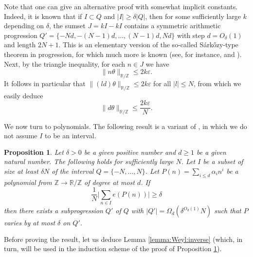 \documentclass[reqno]{amsart}
\newcommand\R{{\mathbb{R}}}
\newcommand\Z{{\mathbb{Z}}}
\newcommand\eps{{\varepsilon}}
\theoremstyle{plain}
\newtheorem{proposition}[theorem]{Proposition}
\theoremstyle{definition}
\begin{document}
Note that one can give an alternative proof with somewhat implicit constants. Indeed, it is known that if $I \subset Q$ and $|I| \ge \delta |Q|$, then for some sufficiently large $k$ depending on $\delta$, the sumset $J = kI-kI$ contains a symmetric arithmetic progression $Q'=\{-Nd,-(N-1)d,\dots, (N-1)d,Nd\}$ with step $d=O_{\delta}(1)$ and length $2N+1$.  This is an elementary version of the so-called S\'ark\H{o}zy-type theorem in progression, for which much more is known (see, for instance, \cite[Lemma 4.4, 5.5]{SzV} and \cite[Lemma B3]{Taosol}). Next, by the triangle inequality, for each $n\in J$ we have 
\[
\|n \theta\|_{\R/\Z} \le 2k \eps.
\]
It follows in particular that $\|(l d) \theta\|_{\R/\Z} \le 2k \eps$ for all $|l|\le N$, from which we easily deduce
\[
\|d\theta\|_{\R/\Z} \le \frac{2k \eps}{N}.
\]

We now turn to polynomials. The following result is a variant of \cite[Proposition 4]{Tao}, in which we do not assume $I$ to be an interval.

\begin{proposition}\label{prop:Weyl:inverse}
Let $\delta>0$ be a given positive number and $d\ge 1$ be a given natural number. The following holds for sufficiently large $N$. Let $I$ be a subset of size at least $\delta N$ of the interval $Q=\{-N,\dots, N\}$. Let $P(n) = \sum_{i \leq d} \alpha_i n^i$ be a polynomial from $\Z \to \R/\Z$ of degree at most $d$. If
\[
\frac{1}{N} \Big|\sum_{n \in I} e(P(n))\Big| \geq \delta
\]
then there exists a subprogression $Q'$ of $Q$ with $|Q'|= \Omega_d(\delta^{O_d(1)} N)$ such that $P$ varies by at most $\delta$ on $Q'$.
\end{proposition}
Before proving the result, let us deduce Lemma \ref{lemma:Weyl:inverse} (which, in turn, will be used in the induction scheme of the proof of Proposition \ref{prop:Weyl:inverse}).
\end{document}
